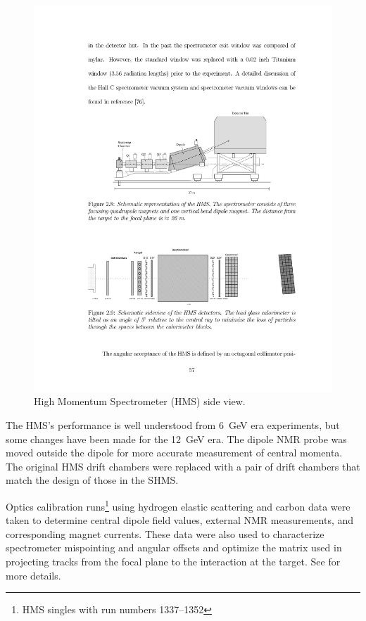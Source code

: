 \begin{figure}[!ht]
    \centering
    \includegraphics[width=1.0\textwidth]{chap3/hms_schematic.pdf}
    \caption{High Momentum Spectrometer (HMS) side view.}
    \label{fig:hms_schematic}
\end{figure}

The HMS's performance is well understood from \SI{6}{\giga\electronvolt} era experiments, but
some changes have been made for the \SI{12}{\giga\electronvolt} era.
The dipole NMR probe was moved outside the dipole for more accurate measurement
of central momenta.
The original HMS drift chambers were replaced with a pair of drift chambers
that match the design of those in the SHMS.

Optics calibration runs\footnote{HMS singles with run numbers 1337–1352}
using hydrogen elastic scattering and carbon data were taken to determine
central dipole field values, external NMR measurements, and corresponding
magnet currents.
These data were also used to characterize spectrometer mispointing and angular
offsets and optimize the matrix used in projecting tracks from the focal
plane to the interaction at the target.
See \cite{Holly_HMS_Optics} for more details.

